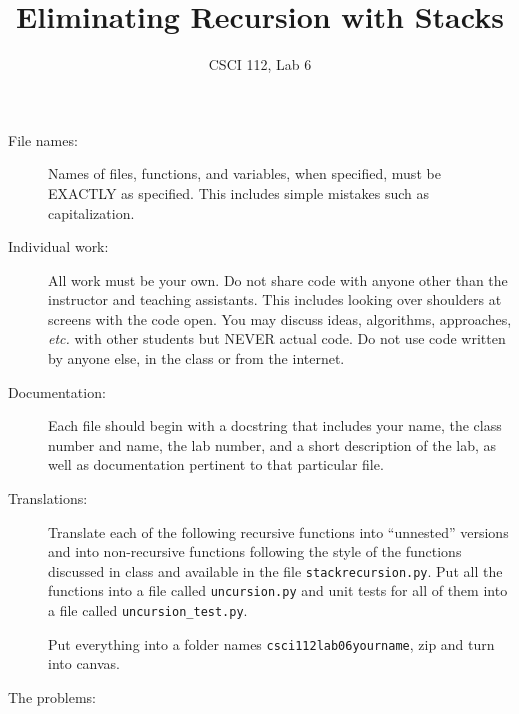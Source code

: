 \documentclass{article}
\title{Eliminating Recursion with Stacks}
\author{CSCI 112, Lab 6}
\date{}
\begin{document}
\sloppy

\maketitle

\begin{description} 
\item[File names:]  Names of files, functions, and variables, 
when specified,
must be EXACTLY as specified.  This includes simple mistakes such
as capitalization.

\item[Individual work:]  All work must be your own.  Do not share
code with anyone other than the instructor and teaching assistants.
This includes looking over shoulders at screens with the code open.
You may discuss ideas, algorithms, approaches, {\em etc.} with
other students but NEVER actual code.  Do not use code
written by anyone else, in the class or from the internet.

\item[Documentation:] Each file should begin with a docstring
that includes your name, the class number and name, the lab
number, and  
a short description of the lab, as well as documentation pertinent
to that particular file.

\item[Translations:]  Translate each of the following
recursive functions into ``unnested'' versions and into
non-recursive functions following
the style of the functions discussed in class and available in the
file \lstinline{stackrecursion.py}.  Put all the functions into
a file called \lstinline{uncursion.py} and unit tests
for all of them into a file called \lstinline{uncursion_test.py}.

Put everything into a folder names {\tt csci112lab06yourname}, zip
and turn into canvas.

\item[The problems:]
\end{description}
\end{document}
